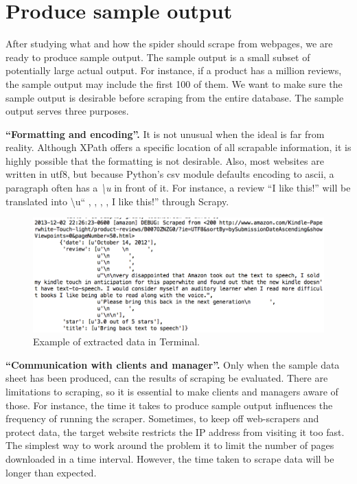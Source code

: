 \documentclass[12pt]{report}
\begin{document}
\section{Produce sample output}

After studying what and how the spider should scrape from webpages, we are ready to produce sample output. The sample output is a small subset of potentially large actual output. For instance, if a product has a million reviews, the sample output may include the first 100 of them. We want to make sure the sample output is desirable before scraping from the entire database. The sample output serves three purposes.

\textbf{``Formatting and encoding''.} It is not unusual when the ideal is far from reality. Although XPath offers a specific location of all scrapable information, it is highly possible that the formatting is not desirable. Also, most websites are written in \gls{utf8}, but because Python's csv module defaults encoding to ascii, a paragraph often has a \textit{\textbackslash u} in front of it. For instance, a review ``I like this!'' will be translated into \textbackslash u``   ,    ,    ,   , I like this!'' through Scrapy.

\begin{figure}[htp]
\includegraphics[width=\textwidth]{scrapy_screenshot_terminal.png}
\caption[Scrapy screenshot in Mac Terminal]
{Example of extracted data in Terminal.}
\end{figure}

\textbf{``Communication with clients and manager''.} Only when the sample data sheet has been produced, can the results of scraping be evaluated. There are limitations to scraping, so it is essential to make clients and managers aware of those. For instance, the time it takes to produce sample output influences the frequency of running the scraper. Sometimes, to keep off web-scrapers and protect data, the target website restricts the IP address from visiting it too fast. The simplest way to work around the problem it to limit the number of pages downloaded in a time interval. However, the time taken to scrape data will be longer than expected.
\end{document}

